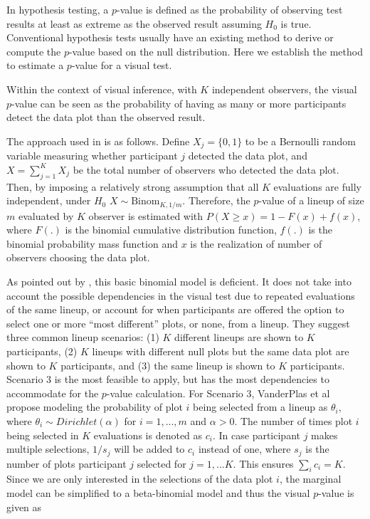\documentclass[]{interact}
\theoremstyle{plain}%
\theoremstyle{definition}
\theoremstyle{remark}
\begin{document}
In hypothesis testing, a \(p\)-value is defined as the probability of
observing test results at least as extreme as the observed result
assuming \(H_0\) is true. Conventional hypothesis tests usually have an
existing method to derive or compute the \(p\)-value based on the null
distribution. Here we establish the method to estimate a \(p\)-value for
a visual test.

Within the context of visual inference, with \(K\) independent
observers, the visual \(p\)-value can be seen as the probability of
having as many or more participants detect the data plot than the
observed result.

The approach used in \citet{majumder_validation_2013} is as follows.
Define \(X_j = \{0,1\}\) to be a Bernoulli random variable measuring
whether participant \(j\) detected the data plot, and
\(X = \sum_{j=1}^{K}X_j\) be the total number of observers who detected
the data plot. Then, by imposing a relatively strong assumption that all
\(K\) evaluations are fully independent, under \(H_0\)
\(X \sim \mathrm{Binom}_{K,1/m}\). Therefore, the \(p\)-value of a
lineup of size \(m\) evaluated by \(K\) observer is estimated with
\(P(X \geq x) = 1 - F(x) + f(x)\), where \(F(.)\) is the binomial
cumulative distribution function, \(f(.)\) is the binomial probability
mass function and \(x\) is the realization of number of observers
choosing the data plot.

As pointed out by \citet{vanderplas2021statistical}, this basic binomial
model is deficient. It does not take into account the possible
dependencies in the visual test due to repeated evaluations of the same
lineup, or account for when participants are offered the option to
select one or more ``most different'' plots, or none, from a lineup.
They suggest three common lineup scenarios: (1) \(K\) different lineups
are shown to \(K\) participants, (2) \(K\) lineups with different null
plots but the same data plot are shown to \(K\) participants, and (3)
the same lineup is shown to \(K\) participants. Scenario 3 is the most
feasible to apply, but has the most dependencies to accommodate for the
\(p\)-value calculation. For Scenario 3, VanderPlas et al propose
modeling the probability of plot \(i\) being selected from a lineup as
\(\theta_i\), where \(\theta_i \sim Dirichlet(\alpha)\) for
\(i=1,...,m\) and \(\alpha > 0\). The number of times plot \(i\) being
selected in \(K\) evaluations is denoted as \(c_i\). In case participant
\(j\) makes multiple selections, \(1/s_j\) will be added to \(c_i\)
instead of one, where \(s_j\) is the number of plots participant \(j\)
selected for \(j=1,...K\). This ensures \(\sum_{i}c_i=K\). Since we are
only interested in the selections of the data plot \(i\), the marginal
model can be simplified to a beta-binomial model and thus the visual
\(p\)-value is given as
\end{document}
